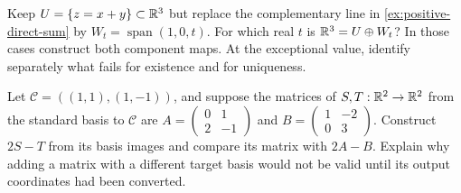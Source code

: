 \begin{exercise}
Keep $U=\{z=x+y\}\subset\mathbb{R}^3$ but replace the complementary line in
\cref{ex:positive-direct-sum} by $W_t=\operatorname{span}(1,0,t)$.
For which real $t$ is $\mathbb{R}^3=U\oplus W_t$? In those cases construct both
component maps. At the exceptional value, identify separately what fails
for existence and for uniqueness.
\end{exercise}
\begin{exercise}
Let $\mathcal C=((1,1),(1,-1))$, and suppose the matrices of $S,T:\mathbb{R}^2\to\mathbb{R}^2$
from the standard basis to $\mathcal C$ are
$A=\left(\begin{matrix}0&1\\2&-1\end{matrix}\right)$ and
$B=\left(\begin{matrix}1&-2\\0&3\end{matrix}\right)$.
Construct $2S-T$ from its basis images and compare its matrix with $2A-B$.
Explain why adding a matrix with a different target basis would not be valid
until its output coordinates had been converted.
\end{exercise}
